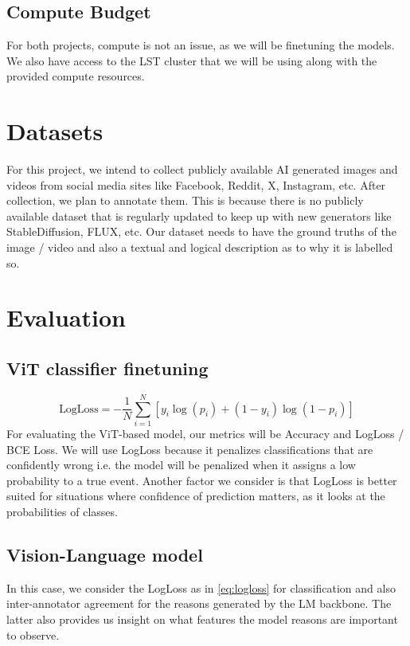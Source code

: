 \documentclass[10pt,twocolumn,letterpaper]{article}
\begin{document}
\subsection{Compute Budget}
For both projects, compute is not an issue, as we will be finetuning the models. We also have access to the LST cluster that we will be using along with the provided compute resources.

\section{Datasets}
For this project, we intend to collect publicly available AI generated images  and videos from social media sites like Facebook, Reddit, X, Instagram, etc. After collection, we plan to annotate them. This is because there is no publicly available dataset that is regularly updated to keep up with new generators like StableDiffusion, FLUX, etc. Our dataset needs to have the ground truths of the image / video and also a textual and logical description as to  why it is labelled so. 

\section{Evaluation}

\subsection{ViT classifier finetuning}
\begin{equation}
\text{LogLoss} = - \frac{1}{N} \sum_{i=1}^{N}[y_{i}\log(p_i) + (1 - y_{i}) \log(1 - p_i)]
\label{eq:logloss}
\end{equation}
For evaluating the ViT-based model, our metrics will be Accuracy and LogLoss / BCE Loss. We will use LogLoss because it penalizes classifications that are confidently wrong i.e. the model will be penalized when it assigns a low probability to a true event. Another factor we consider is that LogLoss is better suited for situations where confidence of prediction matters, as it looks at the probabilities of classes.

\subsection{Vision-Language model}
In this case, we consider the LogLoss as in \ref{eq:logloss} for classification and also inter-annotator agreement for the reasons generated by the LM backbone. The latter also provides us insight on what features the model reasons are important to observe. 
\end{document}
